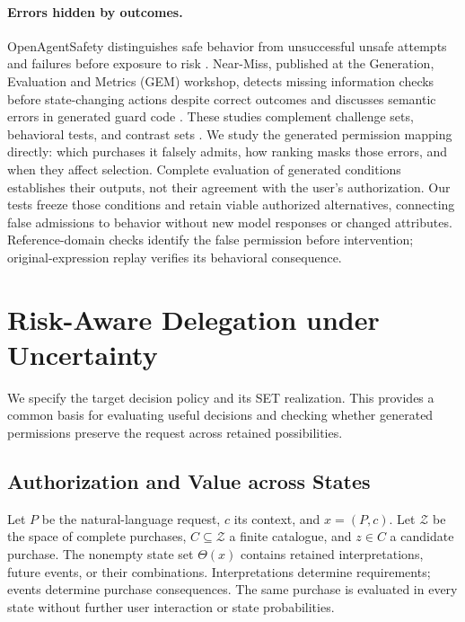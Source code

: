 \documentclass[11pt]{article}
\newcommand{\Z}{\mathcal Z}
\begin{document}
\paragraph{Errors hidden by outcomes.}
OpenAgentSafety distinguishes safe behavior from unsuccessful unsafe attempts and failures before exposure to risk \citep{openagentsafety}. Near-Miss, published at the Generation, Evaluation and Metrics (GEM) workshop, detects missing information checks before state-changing actions despite correct outcomes and discusses semantic errors in generated guard code \citep{nearmiss}. These studies complement challenge sets, behavioral tests, and contrast sets \citep{mccoy2019right,checklist,contrastsets}. We study the generated permission mapping directly: which purchases it falsely admits, how ranking masks those errors, and when they affect selection. Complete evaluation of generated conditions establishes their outputs, not their agreement with the user's authorization. Our tests freeze those conditions and retain viable authorized alternatives, connecting false admissions to behavior without new model responses or changed attributes. Reference-domain checks identify the false permission before intervention; original-expression replay verifies its behavioral consequence.
\section{Risk-Aware Delegation under Uncertainty}
\label{sec:method}
\label{sec:contract}
We specify the target decision policy and its SET realization. This provides a common basis for evaluating useful decisions and checking whether generated permissions preserve the request across retained possibilities.

\subsection{Authorization and Value across States}
\label{sec:formulation}
Let $P$ be the natural-language request, $c$ its context, and $x=(P,c)$. Let $\Z$ be the space of complete purchases, $C\subseteq\Z$ a finite catalogue, and $z\in C$ a candidate purchase. The nonempty state set $\Theta(x)$ contains retained interpretations, future events, or their combinations. Interpretations determine requirements; events determine purchase consequences. The same purchase is evaluated in every state without further user interaction or state probabilities.
\end{document}
